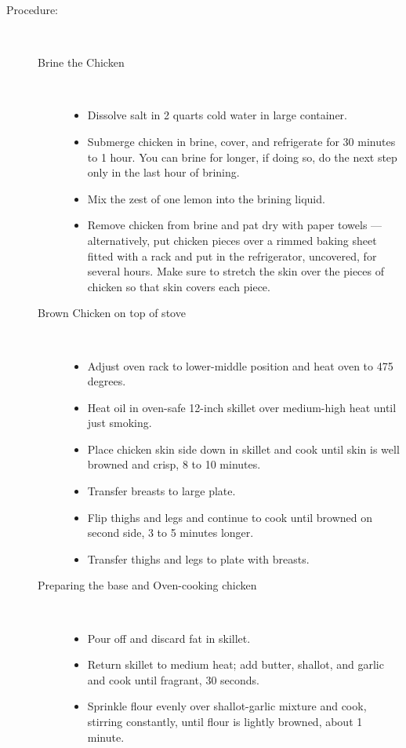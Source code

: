 \documentclass[11pt,letterpaper]{article}
\begin{document}
\begin{description}
\item[Procedure:]\ \\
	\begin{description}
	\item[Brine the Chicken]\ \\
		\begin{itemize}
			\item	Dissolve salt in 2 quarts cold water in large container. 
			\item Submerge chicken in brine, cover, and refrigerate for 30 minutes to 1 hour. You can brine for longer, if doing so, do the next step only in the last hour of brining.
			\item Mix the zest of one lemon into the brining liquid.
			\item Remove chicken from brine and pat dry with paper towels --- alternatively, put chicken pieces over a rimmed baking sheet fitted with a rack and put in the refrigerator, uncovered, for several hours. Make sure to stretch the skin over the pieces of chicken so that skin covers each piece.
		\end{itemize}
	\item[Brown Chicken on top of stove]\ \\
		\begin{itemize}
			\item Adjust oven rack to lower-middle position and heat oven to 475 degrees. 
			\item Heat oil in oven-safe 12-inch skillet over medium-high heat until just smoking. 
			\item Place chicken skin side down in skillet and cook until skin is well browned and crisp, 8 to 10 minutes. 
			\item Transfer breasts to large plate. 
			\item Flip thighs and legs and continue to cook until browned on second side, 3 to 5 minutes longer. 
			\item Transfer thighs and legs to plate with breasts.
		\end{itemize}
	\item[Preparing the base and Oven-cooking chicken]\ \\
		\begin{itemize}
			\item Pour off and discard fat in skillet. 
			\item Return skillet to medium heat; add butter, shallot, and garlic and cook until fragrant, 30 seconds. 
			\item Sprinkle flour evenly over shallot-garlic mixture and cook, stirring constantly, until flour is lightly browned, about 1 minute. 

\end{itemize}
\end{description}
\end{description}
\end{document}
